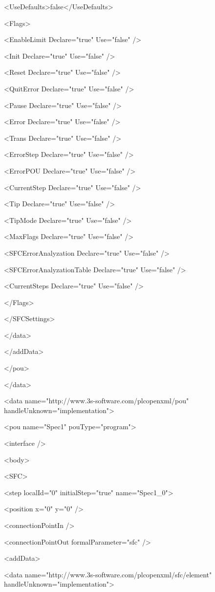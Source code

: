   <UseDefaults>false</UseDefaults>

  <Flags>

   <EnableLimit Declare="true" Use="false" />

   <Init Declare="true" Use="false" />

   <Reset Declare="true" Use="false" />

   <QuitError Declare="true" Use="false" />

   <Pause Declare="true" Use="false" />

   <Error Declare="true" Use="false" />

   <Trans Declare="true" Use="false" />

   <ErrorStep Declare="true" Use="false" />

   <ErrorPOU Declare="true" Use="false" />

   <CurrentStep Declare="true" Use="false" />

   <Tip Declare="true" Use="false" />

   <TipMode Declare="true" Use="false" />

   <MaxFlags Declare="true" Use="false" />

   <SFCErrorAnalyzation Declare="true" Use="false" />

   <SFCErrorAnalyzationTable Declare="true" Use="false" />

   <CurrentSteps Declare="true" Use="false" />

  </Flags>

 </SFCSettings>

</data>

</addData>

</pou>

</data>

<data name="http://www.3s-software.com/plcopenxml/pou" handleUnknown="implementation">

<pou name="Spec1" pouType="program">

<interface />

<body>

<SFC>

 <step localId="0" initialStep="true" name="Spec1\_0">

  <position x="0" y="0" />

  <connectionPointIn />

  <connectionPointOut formalParameter="sfc" />

  <addData>

   <data name="http://www.3s-software.com/plcopenxml/sfc/element" handleUnknown="implementation">

